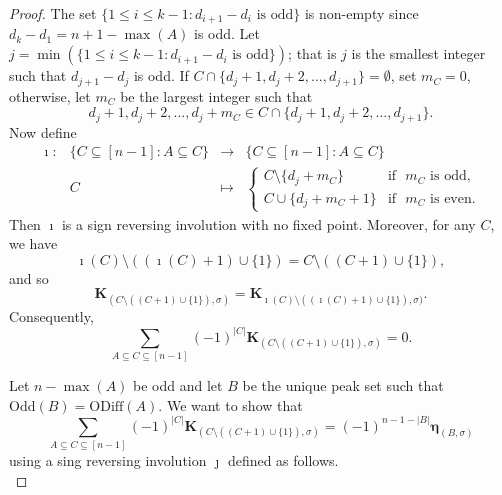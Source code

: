 \documentclass[10pt,a4paper]{amsart}
\newcommand{\boldeta}{{\boldsymbol{\eta}}}
\newcommand{\oddd}{\mathrm{ODiff}}
\newcommand{\odd}{\mathrm{Odd}}
\begin{document}
\begin{proof}
The set $\{1\leq i\leq k-1: d_{i+1}-d_{i} \text{~is odd} \}$ is non-empty since $d_{k}-d_1=n+1-\max(A)$ is odd. Let $j=\min(\{1\leq i\leq k-1: d_{i+1}-d_{i} \text{~is odd}\})$; that is $j$  is the smallest integer such that $d_{j+1}-d_j$ is odd. If $ C\cap \{d_j+1, d_j+2,\dots, d_{j+1}\}=\emptyset$, set $m_C=0$, otherwise, let $m_C$ be the largest integer such that 
$$d_{j}+1,d_j+2,\ldots,d_j+m_C \in C\cap \{d_j+1, d_j+2,\dots, d_{j+1}\}.$$
Now define 
$$
\begin{array}{cccc}
\imath: & \{ C\subseteq [n-1]: A\subseteq C\}&\rightarrow &\{ C\subseteq [n-1]: A\subseteq C\}\\
& C& \mapsto & \begin{cases} 
C\setminus \{d_j+m_C\} & \text{if ~} m_C \text{~is odd,}\\
C\cup \{d_j+m_C+1\} & \text{if ~} m_C \text{~is even.}
\end{cases} 
\end{array}
$$
Then $\imath$ is a sign reversing involution with no fixed point. Moreover, for any $C$, we have
$$\imath(C)\setminus((\imath(C)+1)\cup\{1\})=C\setminus((C+1)\cup\{1\}),$$ and so 
$$\mathbf{K}_{(C\setminus((C+1)\cup\{1\}),\sigma)}=\mathbf{K}_{\imath(C)\setminus((\imath(C)+1)\cup\{1\}),\sigma)}.$$
Consequently, 
$$\sum_{A\subseteq C\subseteq[n-1]}(-1)^{|C|}\mathbf{K}_{(C\setminus((C+1)\cup\{1\}),\sigma)}=0.$$

Let $n-\max(A)$ be odd and let $B$ be the unique peak set such that $\odd(B)=\oddd(A)$. We want to show that 
$$\sum_{A\subseteq C\subseteq[n-1]}(-1)^{|C|}\mathbf{K}_{(C\setminus((C+1)\cup\{1\}),\sigma)}=(-1)^{n-1-|B|}\boldeta_{(B,\sigma)}$$ using a sing reversing involution $\jmath$ defined as follows. \\


\end{proof}
\end{document}
